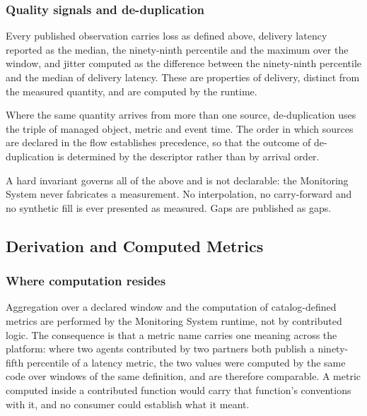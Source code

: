 \hypertarget{quality-signals-and-de-duplication}{%
\subsubsection{Quality signals and de-duplication}\label{quality-signals-and-de-duplication}}

Every published observation carries loss as defined above, delivery
latency reported as the median, the ninety-ninth percentile and the
maximum over the window, and jitter computed as the difference between
the ninety-ninth percentile and the median of delivery latency. These
are properties of delivery, distinct from the measured quantity, and are
computed by the runtime.

Where the same quantity arrives from more than one source,
de-duplication uses the triple of managed object, metric and event time.
The order in which sources are declared in the flow establishes
precedence, so that the outcome of de-duplication is determined by the
descriptor rather than by arrival order.

A hard invariant governs all of the above and is not declarable: the
Monitoring System never fabricates a measurement. No interpolation, no
carry-forward and no synthetic fill is ever presented as measured. Gaps
are published as gaps.

\hypertarget{derivation-and-computed-metrics}{%
\subsection{Derivation and Computed Metrics}\label{derivation-and-computed-metrics}}

\hypertarget{where-computation-resides}{%
\subsubsection{Where computation resides}\label{where-computation-resides}}

Aggregation over a declared window and the computation of
catalog-defined metrics are performed by the Monitoring System runtime,
not by contributed logic. The consequence is that a metric name carries
one meaning across the platform: where two agents contributed by two
partners both publish a ninety-fifth percentile of a latency metric, the
two values were computed by the same code over windows of the same
definition, and are therefore comparable. A metric computed inside a
contributed function would carry that function's conventions with it,
and no consumer could establish what it meant.


